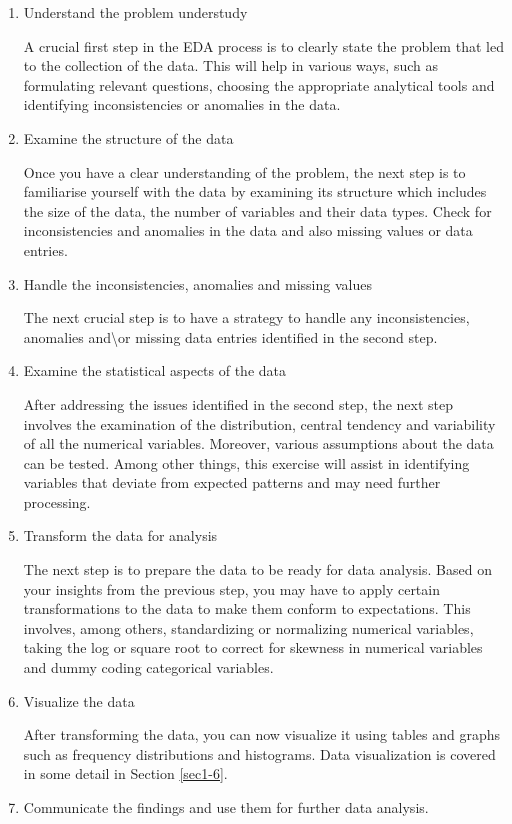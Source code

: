 \documentclass[
]{book}
\begin{document}
\begin{enumerate}
\def\labelenumi{\arabic{enumi}.}
\item
  Understand the problem understudy

  A crucial first step in the EDA process is to clearly state the problem that led to the collection of the data. This will help in various ways, such as formulating relevant questions, choosing the appropriate analytical tools and identifying inconsistencies or anomalies in the data.
\item
  Examine the structure of the data

  Once you have a clear understanding of the problem, the next step is to familiarise yourself with the data by examining its structure which includes the size of the data, the number of variables and their data types. Check for inconsistencies and anomalies in the data and also missing values or data entries.
\item
  Handle the inconsistencies, anomalies and missing values

  The next crucial step is to have a strategy to handle any inconsistencies, anomalies and\textbackslash or missing data entries identified in the second step.
\item
  Examine the statistical aspects of the data

  After addressing the issues identified in the second step, the next step involves the examination of the distribution, central tendency and variability of all the numerical variables. Moreover, various assumptions about the data can be tested. Among other things, this exercise will assist in identifying variables that deviate from expected patterns and may need further processing.
\item
  Transform the data for analysis

  The next step is to prepare the data to be ready for data analysis. Based on your insights from the previous step, you may have to apply certain transformations to the data to make them conform to expectations. This involves, among others, standardizing or normalizing numerical variables, taking the log or square root to correct for skewness in numerical variables and dummy coding categorical variables.
\item
  Visualize the data

  After transforming the data, you can now visualize it using tables and graphs such as frequency distributions and histograms. Data visualization is covered in some detail in Section \ref{sec1-6}.
\item
  Communicate the findings and use them for further data analysis.
\end{enumerate}
\end{document}
